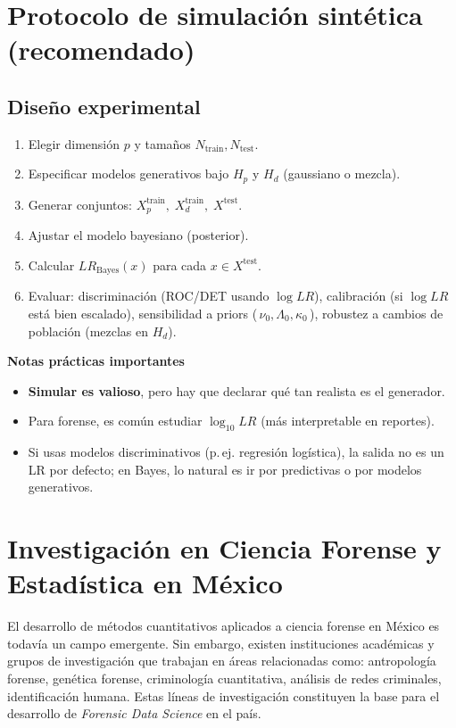 \documentclass[a4paper,10pt,oneside]{article}
\begin{document}
\section{Protocolo de simulaci\'on sint\'etica (recomendado)}

\subsection{Dise\~no experimental}
\begin{enumerate}
\item Elegir dimensi\'on $p$ y tama\~nos $N_{\text{train}},N_{\text{test}}$.
\item Especificar modelos generativos bajo $H_p$ y $H_d$ (gaussiano o mezcla).
\item Generar conjuntos: $X_p^{\text{train}},\;X_d^{\text{train}},\;X^{\text{test}}$.
\item Ajustar el modelo bayesiano (posterior).
\item Calcular $LR_{\text{Bayes}}(x)$ para cada $x\in X^{\text{test}}$.
\item Evaluar: discriminaci\'on (ROC/DET usando $\log LR$), calibraci\'on (si $\log LR$ est\'a bien escalado), sensibilidad a priors (\,$\nu_0,\Lambda_0,\kappa_0$\,), robustez a cambios de poblaci\'on (mezclas en $H_d$).

\end{enumerate}

\textbf{Notas pr\'acticas importantes}

\begin{itemize}
\item \textbf{Simular es valioso}, pero hay que declarar qu\'e tan realista es el generador.
\item Para forense, es com\'un estudiar $\log_{10}LR$ (m\'as interpretable en reportes).
\item Si usas modelos discriminativos (p.\,ej. regresi\'on log\'istica), la salida no es un LR por defecto; en Bayes, lo natural es ir por predictivas o por modelos generativos.
\end{itemize}

\section{Investigaci\'on en Ciencia Forense y Estad\'istica en M\'exico}

El desarrollo de m\'etodos cuantitativos aplicados a ciencia forense en M\'exico es todav\'ia un campo emergente. Sin embargo, existen instituciones acad\'emicas y grupos de investigaci\'on que trabajan en \'areas relacionadas como: antropolog\'ia forense, gen\'etica forense, criminolog\'ia cuantitativa, an\'alisis de redes criminales, identificaci\'on humana. Estas l\'ineas de investigaci\'on constituyen la base para el desarrollo de \textit{Forensic Data Science} en el pa\'is.
\end{document}
